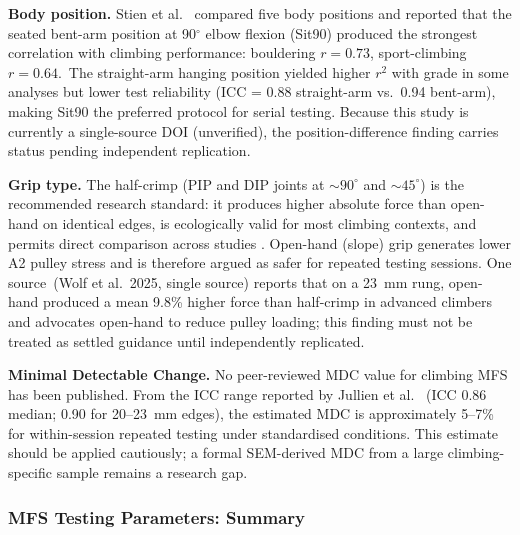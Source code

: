 \medskip
\noindent\textbf{Body position.} Stien et al.\ \cite{TEMP_Stien2025pos} compared five body positions and reported that the seated bent-arm position at 90$^{\circ}$ elbow flexion (Sit90) produced the strongest correlation with climbing performance: bouldering $r = 0.73$, sport-climbing $r = 0.64$.\singlesource\ The straight-arm hanging position yielded higher $r^{2}$ with grade in some analyses but lower test reliability (ICC = 0.88 straight-arm vs.\ 0.94 bent-arm), making Sit90 the preferred protocol for serial testing. Because this study is currently a single-source DOI (unverified), the position-difference finding carries \toverify status pending independent replication.

\medskip
\noindent\textbf{Grip type.} The half-crimp (PIP and DIP joints at $\sim90^{\circ}$ and $\sim45^{\circ}$) is the recommended research standard: it produces higher absolute force than open-hand on identical edges, is ecologically valid for most climbing contexts, and permits direct comparison across studies \cite{TEMP_Jullien2025}. Open-hand (slope) grip generates lower A2 pulley stress and is therefore argued as safer for repeated testing sessions. One \toverify source\singlesource\ (Wolf et al.\ 2025, single source) reports that on a 23~mm rung, open-hand produced a mean 9.8\% higher force than half-crimp in advanced climbers and advocates open-hand to reduce pulley loading; this finding must not be treated as settled guidance until independently replicated.

\medskip
\noindent\textbf{Minimal Detectable Change.} No peer-reviewed MDC value for climbing MFS has been published. From the ICC range reported by Jullien et al.\ \cite{TEMP_Jullien2025} (ICC 0.86 median; 0.90 for 20--23~mm edges), the estimated MDC is approximately 5--7\% for within-session repeated testing under standardised conditions. This estimate should be applied cautiously; a formal SEM-derived MDC from a large climbing-specific sample remains a research gap.

\subsubsection{MFS Testing Parameters: Summary}

